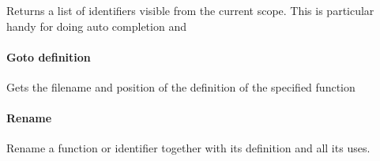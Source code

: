 Returns a list of identifiers visible from the current scope. This is particular
handy for doing auto completion and 


\paragraph{Goto definition}

Gets the filename and position of the definition of the specified function

\paragraph{Rename}

Rename a function or identifier together with its definition and all its uses.


